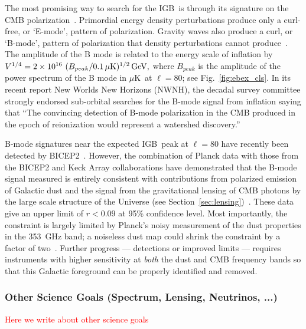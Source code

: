 \documentclass[12pt]{article}
\def\igb{IGB}
\def\microk{$\mu{\mbox{K}}$}
\newcommand{\comred}[1]{\textcolor{red}{#1}}
\begin{document}
The most promising way to search for the \igb\ is through its signature on the CMB polarization~\cite{kamionkowski97b,seljak97}.  
Primordial energy density perturbations produce only a curl-free, or `E-mode', pattern of polarization.
Gravity waves also produce a curl, or `B-mode', pattern of polarization that density perturbations cannot
produce~\cite{kamionkowski97a,zaldarriaga97}.  The amplitude of the B mode is related to the energy scale
of inflation by $V^{1/4}=2\times10^{16} \ ( B_{peak} / 0.1\,\mu{\rm
K})^{1/2} \,{\rm GeV},$ where $B_{peak}$ is the amplitude of the power spectrum of the B mode in \microk\ at $\ell=80$;
see Fig.~\ref{fig:ebex_cls}. In its recent report New Worlds New Horizons (NWNH), the decadal survey 
committee strongly endorsed sub-orbital searches for the B-mode signal from 
inflation saying that ``The convincing detection of B-mode polarization in the CMB produced in the 
epoch of reionization would represent a watershed discovery.''~\cite{blandford2010}

B-mode signatures near the expected \igb\ peak at $\ell=80$ have recently been detected by BICEP2~\cite{bicep2Bmode}. 
However, the combination of Planck data with those from the BICEP2 and Keck Array collaborations have demonstrated 
that the B-mode signal measured is entirely consistent with contributions from polarized emission of Galactic dust and the 
signal from the gravitational lensing of CMB photons by the large scale structure of the Universe (see 
Section~\ref{sec:lensing})~\cite{bkp2015,planck2014-XXX,2016PhRvL.116c1302B}. 
These data give an upper limit of $r<0.09$ at 95\% confidence level.
Most importantly, the constraint is largely limited by Planck's noisy measurement of the dust properties in the 353~GHz band; 
a noiseless dust map could shrink the constraint by a factor of two~\cite{bkp2015}. 
Further progress --- detections or improved limits --- requires instruments 
with higher sensitivity at {\it both} the dust and CMB frequency bands so that this Galactic foreground can be properly identified 
and removed. 

\vspace{-0.22in}

\subsubsection{Other Science Goals (Spectrum, Lensing, Neutrinos, ...)}

\vspace{-0.05in}

\comred{Here we write about other science goals}
\end{document}
